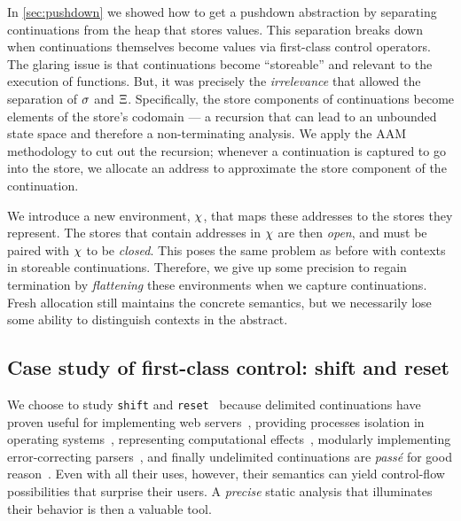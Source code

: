 In \autoref{sec:pushdown} we showed how to get a pushdown abstraction by separating continuations from the heap that stores values.
%
This separation breaks down when continuations themselves become values via first-class control operators.
%
The glaring issue is that continuations become ``storeable'' and relevant to the execution of functions.
%
But, it was precisely the \emph{irrelevance} that allowed the separation of $\sigma$ and $\Xi$.
%
Specifically, the store components of continuations become elements of the store's codomain --- a recursion that can lead to an unbounded state space and therefore a non-terminating analysis.
%
We apply the AAM methodology to cut out the recursion; whenever a continuation is captured to go into the store, we allocate an address to approximate the store component of the continuation.

We introduce a new environment, $\chi$, that maps these addresses to the stores they represent.
%
The stores that contain addresses in $\chi$ are then \emph{open}, and must be paired with $\chi$ to be \emph{closed}.
%
This poses the same problem as before with contexts in storeable continuations.
%
Therefore, we give up some precision to regain termination by \emph{flattening} these environments when we capture continuations.
%
Fresh allocation still maintains the concrete semantics, but we necessarily lose some ability to distinguish contexts in the abstract.

\subsection{Case study of first-class control: shift and reset}
We choose to study {\tt shift} and {\tt reset}~\citep{ianjohnson:danvy:filinski:delim:1990} because delimited continuations have proven useful for implementing web servers~\citep{dvanhorn:Queinnec2004Continuations,jay-communication}, providing processes isolation in operating systems~\citep{ianjohnson:Kiselyov2007Delimited}, representing computational effects~\citep{ianjohnson:Filinski1994Representing}, modularly implementing error-correcting parsers~\citep{ianjohnson:DBLP:conf/icfp/ShiversT11}, and finally undelimited continuations are \emph{pass\'e} for good reason~\citep{ianjohnson:kiselyov:against-callcc}.
%
Even with all their uses, however, their semantics can yield control-flow possibilities that surprise their users.
%
A \emph{precise} static analysis that illuminates their behavior is then a valuable tool.
%

